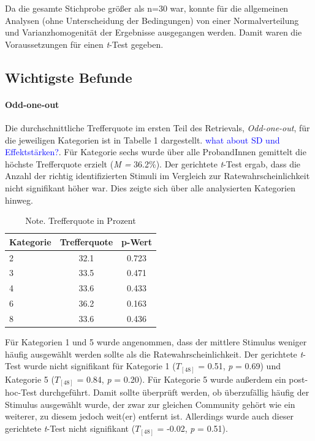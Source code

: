 Da die gesamte Stichprobe größer als n=30 war, konnte für die allgemeinen Analysen (ohne Unterscheidung der Bedingungen) von einer Normalverteilung und Varianzhomogenität der Ergebnisse ausgegangen werden. Damit waren die Voraussetzungen für einen \textit{t}-Test gegeben.

\subsection{Wichtigste Befunde}
\paragraph{Odd-one-out}
Die durchschnittliche Trefferquote im ersten Teil des Retrievals, \textit{Odd-one-out}, für die jeweiligen Kategorien ist in Tabelle 1 dargestellt. \textcolor{blue}{what about SD und Effektstärken?}. Für Kategorie sechs wurde über alle ProbandInnen gemittelt die höchste Trefferquote erzielt (\textit{M =} 36.2\%).
Der gerichtete \textit{t}-Test ergab, dass die Anzahl der richtig identifizierten Stimuli im Vergleich zur Ratewahrscheinlichkeit nicht signifikant höher war. Dies zeigte sich über alle analysierten Kategorien hinweg.

\begin{table}[h]
\centering
\begin{tabular}{l c c} %
\hline
\textbf{Kategorie} & \textbf{Trefferquote} & \textbf{p-Wert}\\
\hline
2 & 32.1 & 0.723\\
3 & 33.5 & 0.471\\
4 & 33.6 & 0.433\\
6 & 36.2 & 0.163\\
8 & 33.6 & 0.436\\
\hline
\end{tabular}
\caption{Note. Trefferquote in Prozent}
\end{table}

Für Kategorien 1 und 5 wurde angenommen, dass der mittlere Stimulus weniger häufig ausgewählt werden sollte als die Ratewahrscheinlichkeit. Der gerichtete \textit{t}-Test wurde nicht signifikant für Kategorie 1 (\(\textit{T}_{[48]}\) = 0.51, \textit{p} = 0.69) und Kategorie 5 (\(\textit{T}_{[48]}\) = 0.84, \textit{p} = 0.20). Für Kategorie 5 wurde außerdem ein post-hoc-Test durchgeführt. Damit sollte überprüft werden, ob überzufällig häufig der Stimulus ausgewählt wurde, der zwar zur gleichen Community gehört wie ein weiterer, zu diesem jedoch weit(er) entfernt ist. Allerdings wurde auch dieser gerichtete \textit{t}-Test nicht signifikant (\(\textit{T}_{[48]}\) = -0.02, \textit{p} = 0.51).

